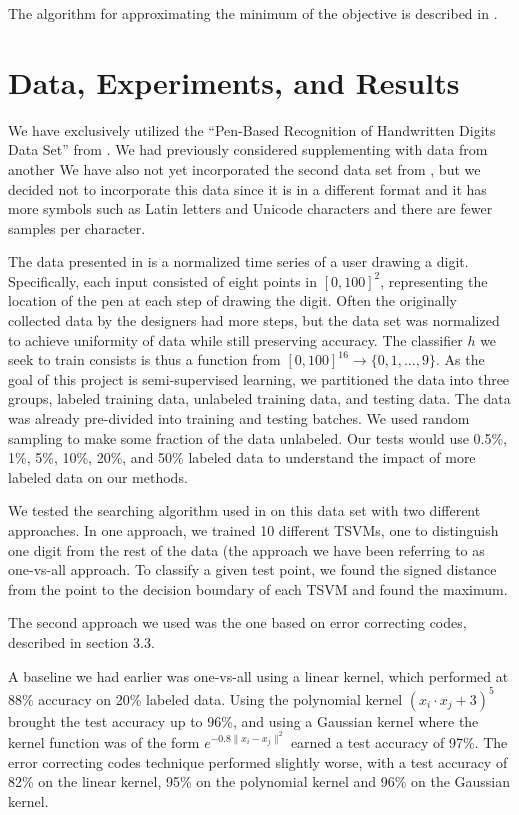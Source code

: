\documentclass[11pt]{article}
\begin{document}
The algorithm for approximating the minimum of the objective is described
in \cite{joachims2003transductive}.


\section{Data, Experiments, and Results}

We have exclusively utilized the ``Pen-Based Recognition of Handwritten Digits Data Set'' from \cite{Alpaydin:1998}. We had previously considered supplementing with data from another We have also not yet incorporated the second data set from \cite{Llorens:2008}, but we decided not to incorporate this data since it is in a different format and it has more symbols such as Latin letters and Unicode characters and there are fewer samples per character.

The data presented in \cite{Alpaydin:1998} is a normalized time series of a user drawing a digit. Specifically, each input consisted of eight points in $[0, 100]^2$, representing the location of the pen at each step of drawing the digit. Often the originally collected data by the designers had more steps, but the data set was normalized to achieve uniformity of data while still preserving accuracy. The classifier $h$ we seek to train consists is thus a function from $[0, 100]^{16} \to \{0, 1, \hdots, 9\}$.  As the goal of this project is semi-supervised learning, we partitioned the data into three groups, labeled training data, unlabeled training data, and testing data. The data was already pre-divided into training and testing batches. We used random sampling to make some fraction of the data unlabeled. Our tests would use 0.5\%, 1\%, 5\%, 10\%, 20\%, and 50\% labeled data to understand the impact of more labeled data on our methods.

We tested the searching algorithm used in \cite{Joachims:1999} on this data set
with two different approaches.
In one approach, we trained 10 different TSVMs, one to distinguish one digit from the rest of the data (the approach we have been referring to as one-vs-all approach.
To classify a given test point, we found the signed distance from the point to the decision boundary of each TSVM and found the maximum.

The second approach we used was the one based on error correcting codes,
described in section 3.3.

A baseline we had earlier was one-vs-all using a linear kernel,
which performed at 88\% accuracy on 20\% labeled data. Using the polynomial
kernel $(x_i\cdot x_j + 3)^5$
brought the test accuracy up to 96\%, and using a Gaussian kernel
where the kernel function was of the form $e^{-0.8\|x_i-x_j\|^2}$
earned a test accuracy of 97\%. The error correcting codes technique
performed slightly worse, with a test accuracy of 82\% on the linear kernel,
95\% on the polynomial kernel and 96\% on the Gaussian kernel.
\end{document}
